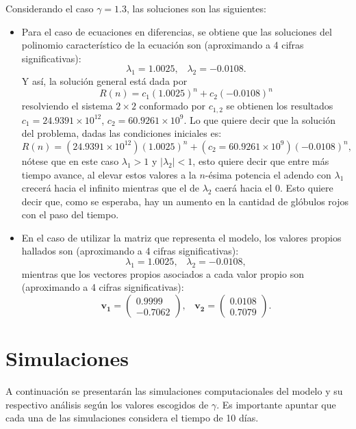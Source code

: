 Considerando el caso $\gamma = 1.3$, las soluciones son las siguientes:
\begin{itemize}
    \item Para el caso de ecuaciones en diferencias, se obtiene que las soluciones del polinomio característico de la ecuación son (aproximando a 4 cifras significativas):
        $$\lambda_1 = 1.0025,\;\;\; \lambda_2 = -0.0108.$$
        Y así, la solución general está dada por 
        $$R(n)=c_1(1.0025)^n+c_2(-0.0108)^n$$
        resolviendo el sistema $2\times 2$ conformado por $c_{1,2}$ se obtienen los resultados $c_1=24.9391\times 10^{12}$, $c_2 = 60.9261\times 10^{9}$. Lo que quiere decir que la solución del problema, dadas las condiciones iniciales es:
        $$R(n)=(24.9391\times 10^{12})(1.0025)^n+(c_2 = 60.9261\times 10^{9})(-0.0108)^n,$$
        nótese que en este caso $\lambda_1>1$ y $|\lambda_2|<1$, esto quiere decir que entre más tiempo avance, al elevar estos valores a la $n$-ésima potencia el adendo con $\lambda_1$ crecerá hacia el infinito mientras que el de $\lambda_2$ caerá hacia el 0. Esto quiere decir que, como se esperaba, hay un aumento en la cantidad de glóbulos rojos con el paso del tiempo.
    \item En el caso de utilizar la matriz que representa el modelo, los valores propios hallados son (aproximando a 4 cifras significativas):
        $$\lambda_1 = 1.0025, \;\;\; \lambda_2 = -0.0108,$$
        mientras que los vectores propios asociados a cada valor propio son (aproximando a 4 cifras significativas):
        $$\mathbf{v_1}=\begin{pmatrix}
            0.9999  \\ 
            -0.7062
            \end{pmatrix},\;\;\;  \mathbf{v_2}=\begin{pmatrix}
            0.0108  \\
            0.7079
            \end{pmatrix}.$$

\end{itemize}

\section{Simulaciones}\label{sec:modelo:simulaciones}
A continuación se presentarán las simulaciones computacionales del modelo y su respectivo análisis según los valores escogidos de $\gamma$. Es importante apuntar que cada una de las simulaciones considera el tiempo de 10 días.

